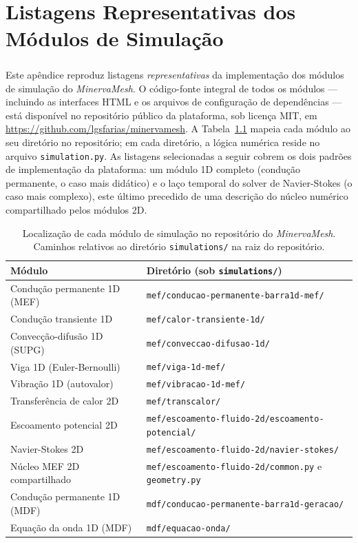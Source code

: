 \chapter{Listagens Representativas dos Módulos de Simulação}
\label{ap:listagens}

\paragraph{}Este apêndice reproduz listagens \emph{representativas} da implementação dos módulos de simulação do \textit{MinervaMesh}. O código-fonte integral de todos os módulos --- incluindo as interfaces HTML e os arquivos de configuração de dependências --- está disponível no repositório público da plataforma, sob licença MIT, em \url{https://github.com/lgsfarias/minervamesh}. A Tabela~\ref{tab:repo_modulos} mapeia cada módulo ao seu diretório no repositório; em cada diretório, a lógica numérica reside no arquivo \texttt{simulation.py}. As listagens selecionadas a seguir cobrem os dois padrões de implementação da plataforma: um módulo 1D completo (condução permanente, o caso mais didático) e o laço temporal do solver de Navier-Stokes (o caso mais complexo), este último precedido de uma descrição do núcleo numérico compartilhado pelos módulos 2D.

\begin{table}[H]
\centering
\caption{Localização de cada módulo de simulação no repositório do \textit{MinervaMesh}. Caminhos relativos ao diretório \texttt{simulations/} na raiz do repositório.}
\label{tab:repo_modulos}
\footnotesize
\begin{tabular}{ll}
\hline
\textbf{Módulo} & \textbf{Diretório (sob \texttt{simulations/})} \\
\hline
Condução permanente 1D (MEF)     & \texttt{mef/conducao-permanente-barra1d-mef/} \\
Condução transiente 1D           & \texttt{mef/calor-transiente-1d/} \\
Convecção-difusão 1D (SUPG)      & \texttt{mef/conveccao-difusao-1d/} \\
Viga 1D (Euler-Bernoulli)        & \texttt{mef/viga-1d-mef/} \\
Vibração 1D (autovalor)          & \texttt{mef/vibracao-1d-mef/} \\
Transferência de calor 2D        & \texttt{mef/transcalor/} \\
Escoamento potencial 2D          & \texttt{mef/escoamento-fluido-2d/escoamento-potencial/} \\
Navier-Stokes 2D                 & \texttt{mef/escoamento-fluido-2d/navier-stokes/} \\
Núcleo MEF 2D compartilhado      & \texttt{mef/escoamento-fluido-2d/common.py} e \texttt{geometry.py} \\
Condução permanente 1D (MDF)     & \texttt{mdf/conducao-permanente-barra1d-geracao/} \\
Equação da onda 1D (MDF)         & \texttt{mdf/equacao-onda/} \\
\hline
\end{tabular}
\end{table}


